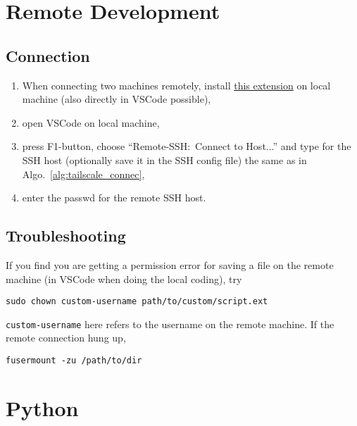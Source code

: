\documentclass[12pt, a4paper]{scrbook}
\numberwithin{equation}{section}
\theoremstyle{definition}
\theoremstyle{definition}
\begin{document}
	\chapter{Remote Development}
	
	\section{Connection}
	
		\begin{enumerate}
			\item When connecting two machines remotely, install \href{https://marketplace.visualstudio.com/items?itemName=ms-vscode-remote.vscode-remote-extensionpack}{this extension} on local machine (also directly in VSCode possible), 
			\item open VSCode on local machine, 
			\item press F1-button, choose \enquote{Remote-SSH:~Connect to Host...} and type for the SSH host (optionally save it in the SSH config file) the same as in Algo.~\eqref{alg:tailscale_connec}, 
			\item enter the passwd for the remote SSH host. 
		\end{enumerate}	

	\section{Troubleshooting}

		If you find you are getting a permission error for saving a file on the remote machine (in VSCode when doing the local coding), try
		
		\begin{lstlisting}[style=mystylebash, label=alg:remote_troubleshooting, xleftmargin=\parindent]
			sudo chown custom-username path/to/custom/script.ext
		\end{lstlisting}
		
		\texttt{custom-username} here refers to the username on the remote machine. If the remote connection hung up,

		\begin{lstlisting}[style=mystylebash, label=alg:fusermount, xleftmargin=\parindent]
			fusermount -zu /path/to/dir
		\end{lstlisting}
	
	\chapter{Python}
	
\end{document}
